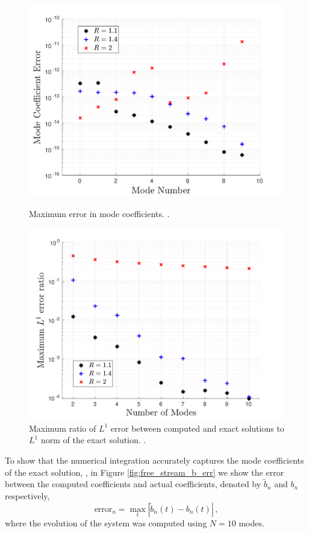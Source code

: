 \begin{figure}[ht]
\centerline{\includegraphics[width=0.8\linewidth]{06-appendix/SpectralMethodBoltzmann/Figures/free_stream_b_err.pdf}}
\caption{Maximum error in mode coefficients. .}\label{fig:free_stream_b_err}
\centerline{\includegraphics[width=0.8\linewidth]{06-appendix/SpectralMethodBoltzmann/Figures/free_stream_L1_err.pdf}}
\caption{Maximum ratio  of $L^1$ error between computed and exact solutions to $L^1$ norm of the exact solution. .}\label{fig:free_stream_L1_err}
\end{figure}

To show that the numerical integration accurately captures the mode coefficients of the exact solution, , in Figure \ref{fig:free_stream_b_err} we show the error between the computed coefficients and actual coefficients, denoted by $\tilde b_n$ and $b_n$ respectively,
\begin{equation}\label{mode_err_def}
\text{error}_n=\max_{t} |\tilde{b}_n(t)-b_n(t)|\,,
\end{equation}
 where the evolution of the system was computed using $N=10$ modes.



